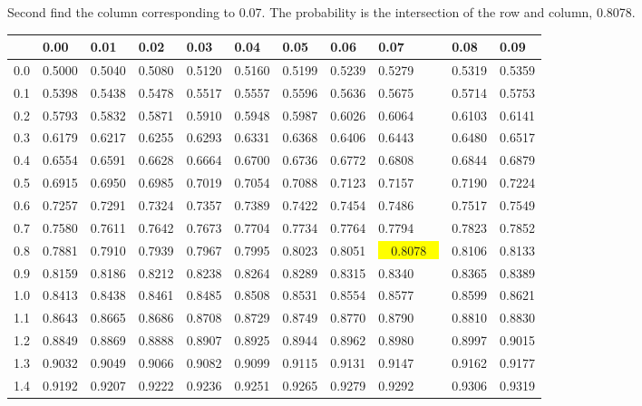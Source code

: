 \begin{frame}
{\small Second find the column corresponding to 0.07. The probability is the
intersection of the row and column, 0.8078.}

  {
\fontsize{5pt}{5pt}
\selectfont

\begin{tabular}{l|lllllll>{\columncolor{blue}}lll}
     & 0.00   & 0.01   & 0.02   & 0.03   & 0.04   & 0.05   & 0.06   & 0.07   & 0.08  & 0.09 \\ \hline
0.0 & 0.5000 & 0.5040 & 0.5080 & 0.5120 & 0.5160 & 0.5199 & 0.5239 & 0.5279 & 0.5319 & 0.5359 \\ 
0.1 & 0.5398 & 0.5438 & 0.5478 & 0.5517 & 0.5557 & 0.5596 & 0.5636 & 0.5675 & 0.5714 & 0.5753 \\ 
0.2 & 0.5793 & 0.5832 & 0.5871 & 0.5910 & 0.5948 & 0.5987 & 0.6026 & 0.6064 & 0.6103 & 0.6141 \\ 
0.3 & 0.6179 & 0.6217 & 0.6255 & 0.6293 & 0.6331 & 0.6368 & 0.6406 & 0.6443 & 0.6480 & 0.6517 \\ 
0.4 & 0.6554 & 0.6591 & 0.6628 & 0.6664 & 0.6700 & 0.6736 & 0.6772 & 0.6808 & 0.6844 & 0.6879 \\ 
0.5 & 0.6915 & 0.6950 & 0.6985 & 0.7019 & 0.7054 & 0.7088 & 0.7123 & 0.7157 & 0.7190 & 0.7224 \\ 
0.6 & 0.7257 & 0.7291 & 0.7324 & 0.7357 & 0.7389 & 0.7422 & 0.7454 & 0.7486 & 0.7517 & 0.7549 \\ 
0.7 & 0.7580 & 0.7611 & 0.7642 & 0.7673 & 0.7704 & 0.7734 & 0.7764 & 0.7794 & 0.7823 & 0.7852 \\ 
\rowcolor{red}0.8 & 0.7881 & 0.7910 & 0.7939 & 0.7967 & 0.7995 & 0.8023 & 0.8051 & {\colorbox{yellow}{~~0.8078~~}} & 0.8106 & 0.8133 \\ 
0.9 & 0.8159 & 0.8186 & 0.8212 & 0.8238 & 0.8264 & 0.8289 & 0.8315 & 0.8340 & 0.8365 & 0.8389 \\ 
1.0 & 0.8413 & 0.8438 & 0.8461 & 0.8485 & 0.8508 & 0.8531 & 0.8554 & 0.8577 & 0.8599 & 0.8621 \\ 
1.1 & 0.8643 & 0.8665 & 0.8686 & 0.8708 & 0.8729 & 0.8749 & 0.8770 & 0.8790 & 0.8810 & 0.8830 \\ 
1.2 & 0.8849 & 0.8869 & 0.8888 & 0.8907 & 0.8925 & 0.8944 & 0.8962 & 0.8980 & 0.8997 & 0.9015 \\ 
1.3 & 0.9032 & 0.9049 & 0.9066 & 0.9082 & 0.9099 & 0.9115 & 0.9131 & 0.9147 & 0.9162 & 0.9177 \\ 
1.4 & 0.9192 & 0.9207 & 0.9222 & 0.9236 & 0.9251 & 0.9265 & 0.9279 & 0.9292 & 0.9306 & 0.9319 \\ 

\end{tabular}}
\end{frame}
